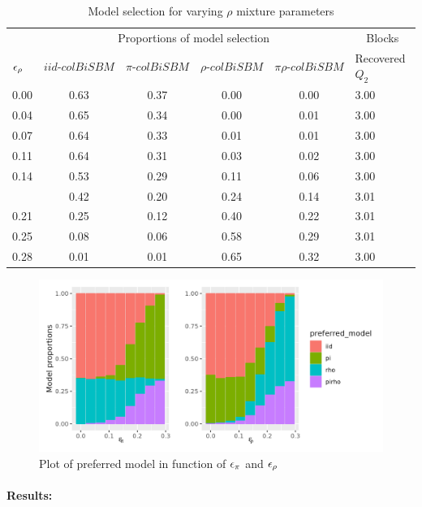 \begin{table}[!h]

\caption{\label{tab:tables}\label{tab:rho-model-sel}Model selection for varying $\rho$ mixture parameters}
\centering
\begin{tabular}[t]{lccccl}
\toprule
\multicolumn{1}{c}{ } & \multicolumn{4}{c}{Proportions of model selection} & \multicolumn{1}{c}{Blocks} \\
\cmidrule(l{3pt}r{3pt}){2-5} \cmidrule(l{3pt}r{3pt}){6-6}
$\eps[\rho]$ & $iid\text{-}colBiSBM$     & $\pi\text{-}colBiSBM$ & $\rho\text{-}colBiSBM$ & $\pi\rho\text{-}colBiSBM$ & Recovered $Q_2$\\
\midrule
0.00 & 0.63 & 0.37 & 0.00 & 0.00 & 3.00\\
0.04 & 0.65 & 0.34 & 0.00 & 0.01 & 3.00\\
0.07 & 0.64 & 0.33 & 0.01 & 0.01 & 3.00\\
0.11 & 0.64 & 0.31 & 0.03 & 0.02 & 3.00\\
0.14 & 0.53 & 0.29 & 0.11 & 0.06 & 3.00\\
\addlinespace
0.18 & 0.42 & 0.20 & 0.24 & 0.14 & 3.01\\
0.21 & 0.25 & 0.12 & 0.40 & 0.22 & 3.01\\
0.25 & 0.08 & 0.06 & 0.58 & 0.29 & 3.01\\
0.28 & 0.01 & 0.01 & 0.65 & 0.32 & 3.00\\
\bottomrule
\end{tabular}
\end{table}

\begin{figure}[H]
\includegraphics{./Rcodes/simulation/img/plot_model_function_eps.png}
\caption{Plot of preferred model in function of $\eps[\pi]$ and $\eps[\rho]$}
\label{fig:pref_model_func_eps}
\end{figure}

\paragraph{Results:}

